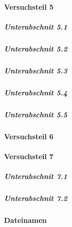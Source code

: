 \documentclass{subfiles}
\begin{document}
        
        \paragraph*{Versuchsteil 5}

            \subparagraph*{Unterabschnit 5.1}

            \subparagraph*{Unterabschnit 5.2}

            \subparagraph*{Unterabschnit 5.3}

            \subparagraph*{Unterabschnit 5.4}

            \subparagraph*{Unterabschnit 5.5}
    
            
        \paragraph*{Versuchsteil 6}

        
        \paragraph*{Versuchsteil 7}

            \subparagraph*{Unterabschnit 7.1}

            \subparagraph*{Unterabschnit 7.2}
            

        \paragraph*{Dateinamen}
\end{document}
